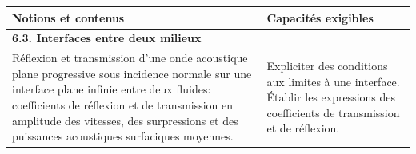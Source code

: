 {\scriptsize
        \begin{tabularx}{\textwidth}{|p{}|X|}
            \hline 
            \textbf{Notions et contenus} & \textbf{Capacités exigibles} \\
            \hline 
            \multicolumn{2}{|l|}{\textbf{6.3. Interfaces entre deux milieux}} \\
            \hline
            Réflexion et transmission d'une onde acoustique plane progressive sous incidence normale sur une interface plane infinie entre deux fluides: coefficients de réflexion et de transmission en amplitude des vitesses, des surpressions et des puissances acoustiques surfaciques moyennes.  & 
            Expliciter des conditions aux limites à une interface.
Établir les expressions des coefficients de transmission et de réflexion.

\end{tabularx}}

